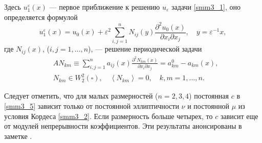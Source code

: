 Здесь $u_1^\varepsilon(x)$ --- первое приближение  к решению $u_\varepsilon$  задачи  \eqref{smm3_1}, оно определяется формулой
$$
u_1^\varepsilon(x)=u_0(x)+\varepsilon^2\sum_{i,j=1}^nN_{ij}(y)\frac{\partial^2u_0(x)}
{\partial x_i\partial x_j},\quad y=\varepsilon^{-1}x,
$$
где $N_{ij}(x)$, ($i,j=1,\dots,n$), --- решение периодической задачи
\begin{align*}
&AN_{km}\equiv\sum_{i,j=1}^na_{ij}(x)\frac{\partial^2N_{km}(x)}{\partial x_i\partial x_j}=
a_{km}^0-a_{km}(x),\\
&N_{km}\in W^2_2(\square),\quad \left<N_{km}\right>=0,\quad k,m=1,\dots,n.
\end{align*}

Следует отметить, что для малых размерностей ($n=2,3,4$) постоянная $c$ в
\eqref{smm3_5} зависит только от постоянной эллиптичности $\nu$ и постоянной $\mu$
из условия Кордеса \eqref{smm3_2}. Если размерность больше четырех, то $c$ зависит
еще от модулей непрерывности коэффициентов.
Эти результаты анонсированы в заметке \cite{smm_SM}. 
